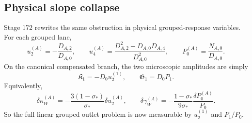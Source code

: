 \subsection{Physical slope collapse}
Stage 172 rewrites the same obstruction in physical grouped-response variables.  For each grouped lane,
\begin{equation}
\label{eq:app-part05-u2-u4-P0-defs}
u_2^{(A)}=-\frac{D_{A,2}}{D_{A,0}},
\qquad
u_4^{(A)}=\frac{D_{A,2}^2-D_{A,0}D_{A,4}}{D_{A,0}^2},
\qquad
P_0^{(A)}=\frac{N_{A,0}}{D_{A,0}}.
\end{equation}
On the canonical compensated branch, the two microscopic amplitudes are simply
\begin{equation}
\label{eq:app-part05-KG-physical}
\mathfrak K_1=-D_0u_2^{(1)},
\qquad
\mathfrak G_1=D_0P_1.
\end{equation}
Equivalently,
\begin{equation}
\label{eq:app-part05-dk-dg-physical}
\delta\kappa_W^{(A)}
=-\frac{3(1-\sigma_*)}{\sigma_*}\delta u_2^{(A)},
\qquad
\delta\gamma_W^{(A)}
=-\frac{1-\sigma_*}{9\sigma_*}\frac{\delta P_0^{(A)}}{P_0}.
\end{equation}
So the full linear grouped outlet problem is now measurable by \(u_2^{(1)}\) and \(P_1/P_0\).

